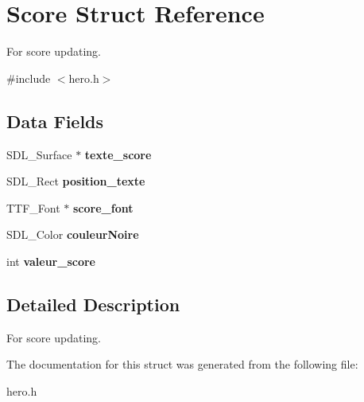 \hypertarget{structScore}{}\section{Score Struct Reference}
\label{structScore}


For score updating.  




{\ttfamily \#include $<$hero.\+h$>$}

\subsection*{Data Fields}
\begin{DoxyCompactItemize}
\item 
\mbox{\label{structScore_ad9bae0529c9c744abdd0b1860b9731d2}} 
S\+D\+L\+\_\+\+Surface $\ast$ {\bfseries texte\+\_\+score}
\item 
\mbox{\label{structScore_ac5b7d95ca27a0c9527b1a3897c4a19d6}} 
S\+D\+L\+\_\+\+Rect {\bfseries position\+\_\+texte}
\item 
\mbox{\label{structScore_a1d2d12c67fabfeb656b6660995d3d856}} 
T\+T\+F\+\_\+\+Font $\ast$ {\bfseries score\+\_\+font}
\item 
\mbox{\label{structScore_a35b649d464a12207405d63b52a4afa58}} 
S\+D\+L\+\_\+\+Color {\bfseries couleur\+Noire}
\item 
\mbox{\label{structScore_a9188e7325c612cb5ece7a0f6c818089a}} 
int {\bfseries valeur\+\_\+score}
\end{DoxyCompactItemize}


\subsection{Detailed Description}
For score updating. 

The documentation for this struct was generated from the following file\+:\begin{DoxyCompactItemize}
\item 
hero.\+h\end{DoxyCompactItemize}
